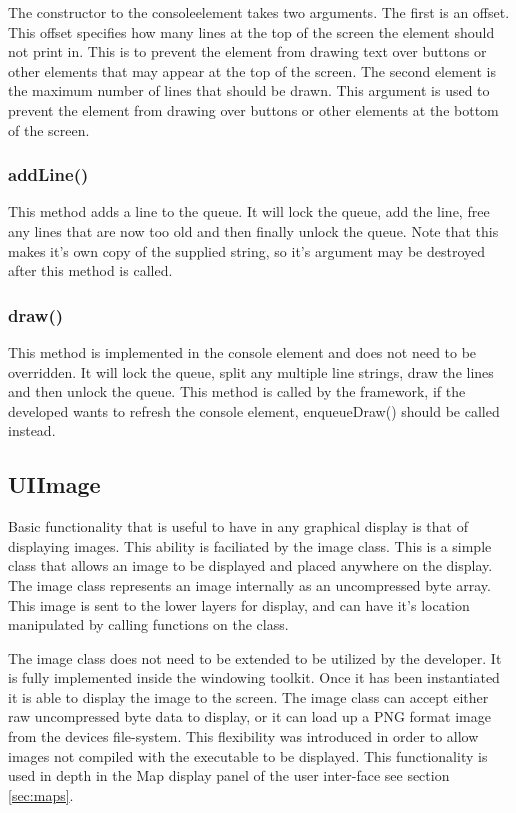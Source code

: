 The constructor to the consoleelement takes two arguments. The first is an offset. This offset specifies how many lines at the top of the screen the element should not print in. This is to prevent the element from drawing text over buttons or other elements that may appear at the top of the screen. The second element is the maximum number of lines that should be drawn. This argument is used to prevent the element from drawing over buttons or other elements at the bottom of the screen.

\subsubsection{addLine()}

This method adds a line to the queue. It will lock the queue, add the line, free any lines that are now too old and then finally unlock the queue. Note that this makes it's own copy of the supplied string, so it's argument may be destroyed after this method is called.

\subsubsection{draw()}

This method is implemented in the console element and does not need to be overridden. It will lock the queue, split any multiple line strings, draw the lines and then unlock the queue. This method is called by the framework, if the developed wants to refresh the console element, enqueueDraw() should be called instead.

\subsection{UIImage}

Basic functionality that is useful to have in any graphical display is that of displaying images. This ability is faciliated by the image class. This is a simple class that allows an image to be displayed and placed anywhere on the display. The image class represents an image internally as an uncompressed byte array. This image is sent to the lower layers for display, and can have it's location manipulated by calling functions on the class.

The image class does not need to be extended to be utilized by the  developer. It is fully implemented inside the windowing toolkit. Once it has been instantiated it is able to display the image to the screen. The image class can accept either raw uncompressed byte data to display, or it can load up a PNG format image from the devices file-system. This flexibility was introduced in order to allow images not compiled with the executable to be displayed. This functionality is used in depth in the Map display panel of the user inter-face see section \ref{sec:maps}.

